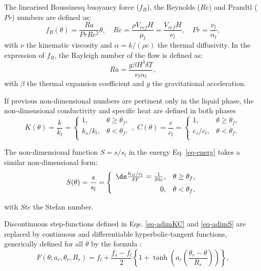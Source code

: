 \noindent The linearised Boussinesq buoyancy force ($f_B$), the Reynolds ($Re$) and Prandtl ($Pr$) numbers are defined as:
\begin{equation}\label{eq-RePr}
f_B(\theta) = \frac{Ra}{Pr Re^2} \theta, \quad Re = \frac{\rho V_{ref} H}{\mu_l}=  \frac{V_{ref} H}{\nu_l} , \quad Pr = \frac{\nu_l}{\alpha_l},
\end{equation}
with $\nu$ the kinematic viscosity and $\alpha = k/(\rho c)$  the thermal diffusivity. In the expression of $f_B$, the Rayleigh number of the flow is defined as:
\begin{equation}
\label{eq-Rayleigh}
Ra = \frac{g \beta H^3 \delta T}{\nu_l \alpha_l},
\end{equation}
with $\beta$ the thermal expansion coefficient and $g$ the gravitational acceleration.

\noindent If previous non-dimensional numbers are pertinent only in the liquid phase, the non-dimensional conductivity and specific heat are  defined in both phases
\begin{equation}\label{eq-adimKC}
K(\theta)= \frac{k}{k_l} =\left\{
\begin{matrix}
1, & \theta \geq \theta_f ,\\
k_s/k_l, & \theta < \theta_f .\\
\end{matrix}
\right.
, \,  \, C(\theta) = \frac{c}{c_l}=\left\{
\begin{matrix}
1, & \theta \geq \theta_f ,\\
c_s/c_l, & \theta < \theta_f .\\
\end{matrix}
\right.
\end{equation}

\noindent The non-dimensional function $S = s/s_l$ in the energy Eq. \ref{eq-energ} takes a similar non-dimensional form:
\begin{equation}\label{eq-adimS}
S(\theta)= \frac{s}{s_l} =\left\{
\begin{array}{rl} \vspace{0.2cm}
\ds \frac{h_{sl}/c_l}{\delta T} = \frac{1}{Ste}, & \theta \geq \theta_f ,\\
0, & \theta < \theta_f,\\
\end{array}
\right.
\end{equation}

\noindent with $Ste$ the Stefan number.

\noindent Discontinuous step-functions defined in Eqs. \ref{eq-adimKC}  and \ref{eq-adimS} are replaced by continuous and differentiable hyperbolic-tangent functions, generically defined for all $\theta$ by the formula \citep{dan-2014-JCP}:
\begin{equation}
F(\theta; a_r, \theta_r, R_r) = f_l + \frac{f_s-f_l}{2}\left\{
1 + \tanh\left( a_r \left(\frac{\theta_r-\theta}{R_r}\right)\right)
\right\},
\label{eq-smooth}
\end{equation}


